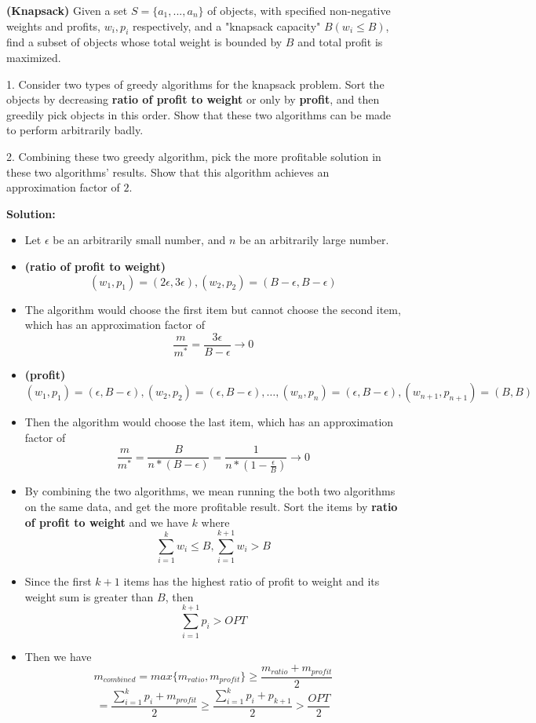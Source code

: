 \documentclass{article}
\newcounter{exercise}
\newcommand{\<}{
    \langle}
\renewcommand{\>}{
    \rangle}
\begin{document}
{\begin{exercise}
	\textbf{(Knapsack)} Given a set $S = \{a_1, ... , a_n\}$ of objects, with specified non-negative weights and profits, $w_i,p_i$ respectively, and a "knapsack capacity" $B (w_i \le B)$, find a subset of objects whose total weight is bounded by $B$ and total profit is maximized.
	
	1. Consider two types of greedy algorithms for the knapsack problem. Sort the objects by decreasing \textbf{ratio of profit to weight} or only by \textbf{profit}, and then greedily pick objects in this order. Show that these two algorithms can be made to perform arbitrarily badly.
	
	2. Combining these two greedy algorithm, pick the more profitable solution in these two algorithms' results. Show that this algorithm achieves an approximation factor of $2$.
\end{exercise}

\textbf{Solution:}
\begin{itemize}
	\item Let $\epsilon$ be an arbitrarily small number, and $n$ be an arbitrarily large number.
	\item \textbf{(ratio of profit to weight)} 
	$$
	(w_1,p_1)=(2\epsilon,3\epsilon),(w_2,p_2)=(B-\epsilon,B-\epsilon)
	$$
	\item The algorithm would choose the first item but cannot choose the second item, which has an approximation factor of 
	$$
	\frac{m}{m^*}=\frac{3\epsilon}{B-\epsilon}\rightarrow 0
	$$
	\item \textbf{(profit)} 
	$$
	(w_1,p_1)=(\epsilon,B-\epsilon),(w_2,p_2)=(\epsilon,B-\epsilon),\ldots,(w_n,p_n)=(\epsilon,B-\epsilon),(w_{n+1},p_{n+1})=(B,B)
	$$
	\item Then the algorithm would choose the last item, which has an approximation factor of
	$$
	\frac{m}{m^*}=\frac{B}{n*(B-\epsilon)}= \frac{1}{n*(1-\frac{\epsilon}{B})}\rightarrow 0
	$$
	\item By combining the two algorithms, we mean running the both two algorithms on the same data, and get the more profitable result. Sort the items by \textbf{ratio of profit to weight} and we have $k$ where
	$$
	\sum_{i=1}^{k}{w_i}\leq B, \sum_{i=1}^{k+1}{w_i}> B
	$$
	\item Since the first $k+1$ items has the highest ratio of profit to weight and its weight sum is greater than $B$, then
	$$
	\sum_{i=1}^{k+1}{p_i}> OPT
	$$
	\item Then we have
	$$
	m_{combined}=max\{m_{ratio},m_{profit}\}\geq \frac{m_{ratio}+m_{profit}}{2}
	$$
	$$
	=\frac{\sum_{i=1}^{k}{p_i}+m_{profit}}{2}\geq \frac{\sum_{i=1}^{k}{p_i}+p_{k+1}}{2}>\frac{OPT}{2}
	$$


\end{itemize}}
\end{document}
